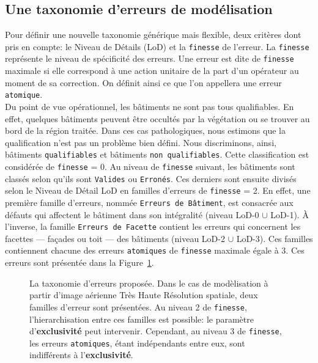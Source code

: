     \subsection*{Une taxonomie d'erreurs de modélisation}
        Pour définir une nouvelle taxonomie générique mais flexible, deux critères dont pris en compte: le Niveau de Détails (LoD) et la \texttt{finesse} de l'erreur.
        La \texttt{finesse} représente le niveau de spécificité des erreurs.
        Une erreur est dite de \texttt{finesse} maximale si elle correspond à une action unitaire de la part d'un opérateur au moment de sa correction.
        On définit ainsi ce que l'on appellera une erreur \texttt{atomique}.\\

        Du point de vue opérationnel, les bâtiments ne sont pas tous qualifiables.
        En effet, quelques bâtiments peuvent être occultés par la végétation ou se trouver au bord de la région traitée.
        Dans ces cas pathologiques, nous estimons que la qualification n'est pas un problème bien défini.
        Nous discriminons, ainsi, bâtiments \texttt{qualifiables} et bâtiments \texttt{non qualifiables}.
        Cette classification est considérée de \texttt{finesse} = 0.
        Au niveau de \texttt{finesse} suivant, les bâtiments sont classés selon qu'ils sont \texttt{Valides} ou \texttt{Erronés}.
        Ces derniers sont ensuite divisés selon le Niveau de Détail LoD en familles d'erreurs de \texttt{finesse} = 2.
        En effet, une première famille d'erreurs, nommée \texttt{Erreurs de Bâtiment}, est consacrée aux défauts qui affectent le bâtiment dans son intégralité (niveau LoD-0 \(\cup\) LoD-1).
        \`A l'inverse, la famille \texttt{Erreurs de Facette} contient les erreurs qui concernent les facettes --- façades ou toit --- des bâtiments (niveau LoD-2 \(\cup\) LoD-3).
        Ces familles contiennent chacune des erreurs \texttt{atomiques} de \texttt{finesse} maximale égale à $3$.
        Ces erreurs sont présentée dans la Figure~\ref{fig::taxonomy_francais}.\\

        \begin{figure}[htb]
            \begin{center}
                
                \caption[
                    La taxonomie d'erreurs proposée.
                ]{
                    \label{fig::taxonomy_francais} 
                    La taxonomie d'erreurs proposée.
                    Dans le cas de modèlisation à partir d'image aérienne Très Haute Résolution spatiale, deux familles d'erreur sont présentées.
                    Au niveau 2 de \texttt{finesse}, l'hierarchisation entre ces familles est possible: le paramètre d'\textbf{exclusivité} peut intervenir.
                    Cependant, au niveau 3 de \texttt{finesse}, les erreurs \texttt{atomiques}, étant indépendants entre eux, sont indifférents à l'\textbf{exclusivité}.
                }
            \end{center}
        \end{figure}

